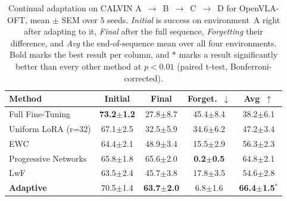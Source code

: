 \begin{table}[tbp]
    \centering
    \setlength{\abovecaptionskip}{0pt}
    \setlength{\belowcaptionskip}{2pt}
    \caption{Continual adaptation on CALVIN A~$\to$~B~$\to$~C~$\to$~D for OpenVLA-OFT, mean $\pm$ SEM over $5$ seeds. \emph{Initial} is success on environment~A right after adapting to it, \emph{Final} after the full sequence, \emph{Forgetting} their difference, and \emph{Avg} the end-of-sequence mean over all four environments. Bold marks the best result per column, and $\ast$ marks a result significantly better than every other method at $p<0.01$ (paired t-test, Bonferroni-corrected).}
    \label{tab:continual-openvla}
    \scriptsize
    \renewcommand{\arraystretch}{0.92}
    \setlength{\tabcolsep}{3.5pt}
    \begin{tabular}{@{}lcccc@{}}
        \toprule
        \textbf{Method} & \textbf{Initial} & \textbf{Final} & \textbf{Forget.~$\downarrow$} & \textbf{Avg~$\uparrow$} \\
        \midrule
        Full Fine-Tuning            & \textbf{73.2$\pm$1.2} & 27.8$\pm$8.7 & 45.4$\pm$8.4 & 38.2$\pm$6.1 \\
        Uniform LoRA (r=32)                & 67.1$\pm$2.5 & 32.5$\pm$5.9 & 34.6$\pm$6.2 & 47.2$\pm$3.4 \\
        EWC~\cite{Kirkpatrick2017EWC} & 64.4$\pm$2.1 & 48.9$\pm$3.4 & 15.5$\pm$2.9 & 56.3$\pm$2.3 \\
        Progressive Networks~\cite{Rusu2016Progressive} & 65.8$\pm$1.8 & 65.6$\pm$2.0 & \textbf{0.2$\pm$0.5} & 64.8$\pm$2.1 \\
        LwF~\cite{LiHoiem2017LwF}   & 63.5$\pm$2.4 & 45.7$\pm$3.8 & 17.8$\pm$3.5 & 54.6$\pm$2.8 \\
        \midrule
        \textbf{Adaptive}           & 70.5$\pm$1.4 & \textbf{63.7$\pm$2.0} & 6.8$\pm$1.6 & \textbf{66.4$\pm$1.5}$^{\ast}$ \\
        \bottomrule
    \end{tabular}
\end{table}
